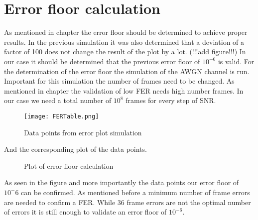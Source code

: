 \section{Error floor calculation}
As mentioned in chapter  the error floor should be determined to achieve proper results. In the previous simulation it was also determined that a deviation of a factor of 100 does not change the result of the plot by a lot. 
(!!!add figure!!!)
In our case it should be determined that the previous error floor of $10^{-6}$ is valid. 
\newline
For the determination of the error floor the simulation of the \gls{AWGN} channel is run. Important for this simulation the number of frames need to be changed. As mentioned in chapter  the validation of low \gls{FER} needs high number frames. In our case we need a total number of $10^{8}$ frames for every step of SNR.
\begin{figure}[!htb]
	\centering
	\texttt{[image: FERTable.png]}
	\caption{Data points from error plot simulation}
	\label{fig:ErrorTable}
\end{figure}
And the corresponding plot of the data points.
\begin{figure}[!htb]
	\setlength{}
	\setlength\fheight{0.4\textheight}
	\centering
	
	\caption{Plot of error floor calculation}
	\label{fig:ErrorFloor}
\end{figure}
As seen in the figure and more importantly the data points our error floor of $10^-6$ can be confirmed. As mentioned before a minimum number of frame errors are needed to confirm a \gls{FER}. While 36 frame errors are not the optimal number of errors it is still enough to validate an error floor of $10^{-6}$.






\clearpage
